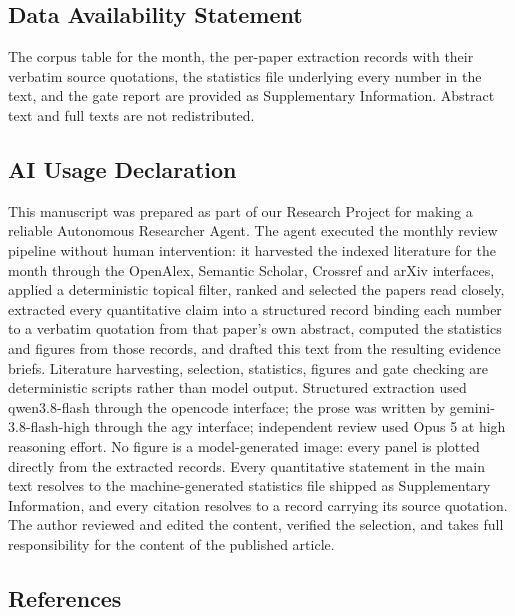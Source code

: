 \documentclass[
  11pt,
]{article}
\begin{document}
\subsection{Data Availability
Statement}\label{data-availability-statement}

The corpus table for the month, the per-paper extraction records with
their verbatim source quotations, the statistics file underlying every
number in the text, and the gate report are provided as Supplementary
Information. Abstract text and full texts are not redistributed.

\subsection{AI Usage Declaration}\label{ai-usage-declaration}

This manuscript was prepared as part of our Research Project for making
a reliable Autonomous Researcher Agent. The agent executed the monthly
review pipeline without human intervention: it harvested the indexed
literature for the month through the OpenAlex, Semantic Scholar,
Crossref and arXiv interfaces, applied a deterministic topical filter,
ranked and selected the papers read closely, extracted every
quantitative claim into a structured record binding each number to a
verbatim quotation from that paper's own abstract, computed the
statistics and figures from those records, and drafted this text from
the resulting evidence briefs. Literature harvesting, selection,
statistics, figures and gate checking are deterministic scripts rather
than model output. Structured extraction used qwen3.8-flash through the
opencode interface; the prose was written by gemini-3.8-flash-high
through the agy interface; independent review used Opus 5 at high
reasoning effort. No figure is a model-generated image: every panel is
plotted directly from the extracted records. Every quantitative
statement in the main text resolves to the machine-generated statistics
file shipped as Supplementary Information, and every citation resolves
to a record carrying its source quotation. The author reviewed and
edited the content, verified the selection, and takes full
responsibility for the content of the published article.

\subsection{References}\label{references}
\end{document}
